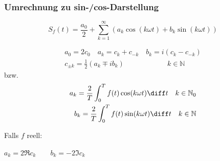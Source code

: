 \begin{sectionbox}
    \subsubsection{Umrechnung zu sin-/cos-Darstellung}
    \begin{emphbox}
        \begin{equation*}
            S_f(t)=\frac{a_0}{2}+\sum_{k=1}^{\infty}(a_k\cos(k\omega t) + b_k\sin(k\omega t))
        \end{equation*}
    \end{emphbox}
    \begin{align*}
        a_0=2c_0 \quad a_k=c_k+c_{-k} \quad b_k=i(c_k-c_{-k}) \\
        c_{\pm k} = \frac{1}{2}(a_k \mp ib_k) \qquad\qquad\qquad k\in\mathbb N
    \end{align*}
    bzw.
    \begin{align*}
        a_k=\frac{2}{T}\int_0^Tf(t)\cos(k\omega t)\diff t \quad k \in \mathbb N_0 \\
        b_k=\frac{2}{T}\int_0^Tf(t)\sin(k\omega t)\diff t \quad k \in \mathbb N
    \end{align*}

    Falls $f$ reell:
    \begin{center}
        $a_k=2\Re{c_k} \qquad b_k=-2\Im{c_k}$
    \end{center}

\end{sectionbox}

